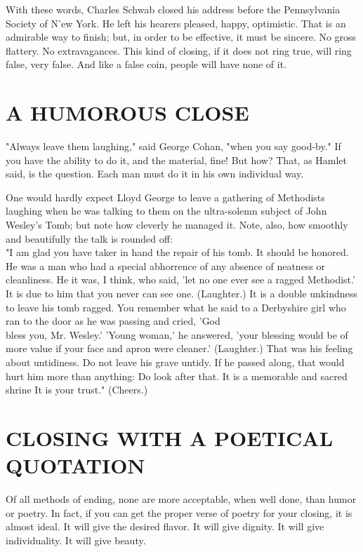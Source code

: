 \documentclass[10pt]{article}
\begin{document}
With these words, Charles Schwab closed his address before the Pennsylvania Society of N'ew York. He left his hearers pleased, happy, optimistic. That is an admirable way to finish; but, in order to be effective, it must be sincere. No gross flattery. No extravagances. This kind of closing, if it does not ring true, will ring false, very false. And like a false coin, people will have none of it.

\section*{A HUMOROUS CLOSE}
"Always leave them laughing," said George Cohan, "when you say good-by." If you have the ability to do it, and the material, fine! But how? That, as Hamlet said, is the question. Each man must do it in his own individual way.

One would hardly expect Lloyd George to leave a gathering of Methodists laughing when he was talking to them on the ultra-solemn subject of John Wesley's Tomb; but note how cleverly he managed it. Note, also, how smoothly and beautifully the talk is rounded off:\\
"I am glad you have taker in hand the repair of his tomb. It should be honored. He was a man who had a special abhorrence of any absence of neatness or cleanliness. He it was, I think, who said, 'let no one ever see a ragged Methodist.' It is due to him that you never can see one. (Laughter.) It is a double unkindness to leave his tomb ragged. You remember what he said to a Derbyshire girl who ran to the door as he was passing and cried, 'God\\
bless you, Mr. Wesley.' 'Young woman,' he answered, 'your blessing would be of more value if your face and apron were cleaner.' (Laughter.) That was his feeling about untidiness. Do not leave his grave untidy. If he passed along, that would hurt him more than anything: Do look after that. It is a memorable and sacred shrine It is your trust." (Cheers.)

\section*{CLOSING WITH A POETICAL QUOTATION}
Of all methods of ending, none are more acceptable, when well done, than humor or poetry. In fact, if you can get the proper verse of poetry for your closing, it is almost ideal. It will give the desired flavor. It will give dignity. It will give individuality. It will give beauty.
\end{document}
